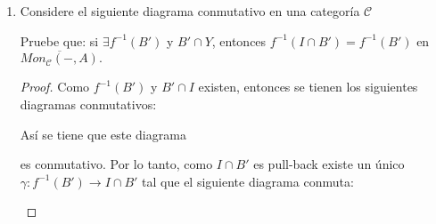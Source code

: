 \documentclass{article}
\begin{document}
\begin{enumerate}[label=\textbf{Ej \arabic*.}]
\begin{proof}
			 conmuta, luego $\delta'$ es tal que $\gamma_1=\beta_1\delta'$ y 
			\begin{equation*}
				\mu\gamma_2=\lrprth{\mu f'}\delta'=\beta_2\delta'.
			\end{equation*}
			Por lo tantto, aplicando la propiedad universal del pull-back a (\ref{pborig}) se tiene que $\delta'=\delta$, con lo cual  se tien que existe un único morfismo $\delta$ tal que el siguiente diagrama conmuta
			\begin{center}
				,
			\end{center}	
		i.e. (\ref{pdpb}) es un pull-back y así se tiene lo deseado.\\
		\end{proof}
		\item Considere el siguiente diagrama conmutativo en una categoría $\mathscr{C}$
		
		\centerline{
			}
		Pruebe que: si $\exists f^{-1}(B')$ y $B'\cap Y$, entonces $f^{-1}(I\cap B')= f^{-1}(B')$ en $\overline{Mon_{\mathscr{C}}(-,A)}.$ 
		
		\begin{proof}
			Como $f^{-1}(B')$ y $B'\cap I$ existen, entonces se tienen los siguientes diagramas conmutativos:\\
			
			\centerline{
				}
			Así se tiene que este diagrama
			
			\centerline{
				}
			es conmutativo. Por lo tanto, como $I\cap B'$ es pull-back existe un único $ \gamma: f^{-1}(B')\to I\cap B'$ tal que el siguiente diagrama conmuta:\\
			
			\centerline{
				}
			

\end{proof}
\end{enumerate}
\end{document}
